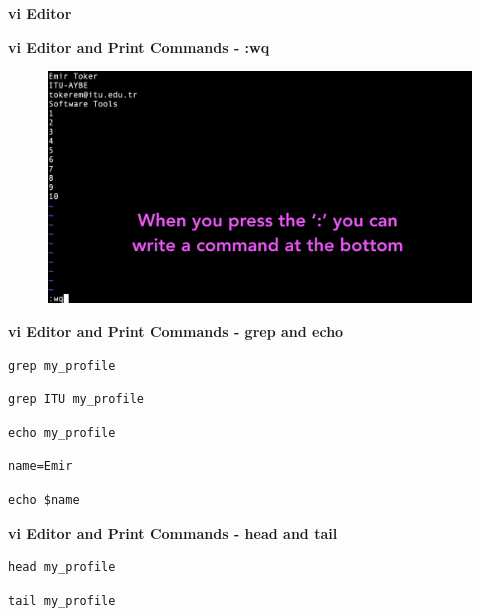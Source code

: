 \documentclass[ignorenonframetext,]{beamer}
\begin{document}
\begin{frame}[fragile]{\textbf{vi Editor}}
\begin{block}{\textbf{vi Editor and Print Commands - {\textbf{:wq}}}}
\begin{figure}
\centering
\includegraphics{vi_3.png}
\caption{}
\end{figure}

\end{block}

\begin{block}{\textbf{vi Editor and Print Commands - {\textbf{grep}} and
{\textbf{echo}}}}

\begin{verbatim}
grep my_profile
\end{verbatim}

\begin{verbatim}
grep ITU my_profile
\end{verbatim}

\begin{verbatim}
echo my_profile
\end{verbatim}

\begin{verbatim}
name=Emir
\end{verbatim}

\begin{verbatim}
echo $name
\end{verbatim}

\end{block}

\begin{block}{\textbf{vi Editor and Print Commands - {\textbf{head}} and
{\textbf{tail}}}}

\begin{verbatim}
head my_profile
\end{verbatim}

\begin{verbatim}
tail my_profile
\end{verbatim}


\end{block}
\end{frame}
\end{document}
